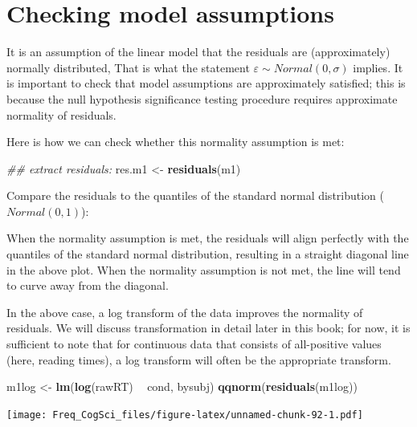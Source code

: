 \documentclass[12pt,]{krantz}
\newenvironment{Shaded}{\begin{snugshade}}{\end{snugshade}}
\newcommand{\CommentTok}[1]{\textcolor[rgb]{0.56,0.35,0.01}{\textit{#1}}}
\newcommand{\KeywordTok}[1]{\textcolor[rgb]{0.13,0.29,0.53}{\textbf{#1}}}
\newcommand{\NormalTok}[1]{#1}
\newcommand{\OperatorTok}[1]{\textcolor[rgb]{0.81,0.36,0.00}{\textbf{#1}}}
\newcommand{\StringTok}[1]{\textcolor[rgb]{0.31,0.60,0.02}{#1}}
\begin{document}
\hypertarget{checking-model-assumptions}{%
\section{Checking model assumptions}\label{checking-model-assumptions}}

It is an assumption of the linear model that the residuals are (approximately) normally distributed, That is what the statement \(\varepsilon\sim Normal(0,\sigma)\) implies. It is important to check that model assumptions are approximately satisfied; this is because the null hypothesis significance testing procedure requires approximate normality of residuals.

Here is how we can check whether this normality assumption is met:

\begin{Shaded}
\begin{Highlighting}[]
\CommentTok{## extract residuals:}
\NormalTok{res.m1 <-}\StringTok{ }\KeywordTok{residuals}\NormalTok{(m1)}
\end{Highlighting}
\end{Shaded}

Compare the residuals to the quantiles of the standard normal distribution (\(Normal(0,1)\)):

When the normality assumption is met, the residuals will align perfectly with the quantiles of the standard normal distribution, resulting in a straight diagonal line in the above plot. When the normality assumption is not met, the line will tend to curve away from the diagonal.

In the above case, a log transform of the data improves the normality of residuals. We will discuss transformation in detail later in this book; for now, it is sufficient to note that for continuous data that consists of all-positive values (here, reading times), a log transform will often be the appropriate transform.

\begin{Shaded}
\begin{Highlighting}[]
\NormalTok{m1log <-}\StringTok{ }\KeywordTok{lm}\NormalTok{(}\KeywordTok{log}\NormalTok{(rawRT) }\OperatorTok{~}\StringTok{ }\NormalTok{cond, bysubj)}
\KeywordTok{qqnorm}\NormalTok{(}\KeywordTok{residuals}\NormalTok{(m1log))}
\end{Highlighting}
\end{Shaded}

\texttt{[image: Freq\_CogSci\_files/figure-latex/unnamed-chunk-92-1.pdf]}
\end{document}
